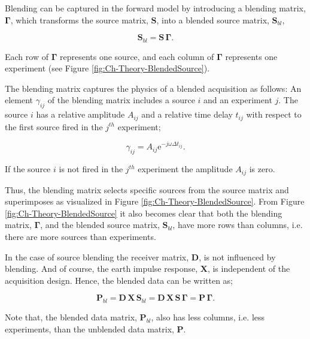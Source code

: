Blending can be captured in the forward model by introducing a blending matrix, $\mathbf{\Gamma}$, which transforms the source matrix, $\mathbf{S}$, into a blended source matrix, $\mathbf{S}_{bl}$,

\begin{equation}
	\mathbf{S}_{bl} = \mathbf{S \, \Gamma}.
	\label{eq:Ch-Theory-BlendedSource}
\end{equation}

 Each row of $\mathbf{\Gamma}$ represents one source, and each column of $\mathbf{\Gamma}$ represents one experiment (see Figure \ref{fig:Ch-Theory-BlendedSource}). 
 
 The blending matrix captures the physics of a blended acquisition as follows: An element $\gamma_{ij}$ of the blending matrix includes a source $i$ and an experiment $j$. The source $i$ has a relative amplitude $A_{ij}$ and a relative time delay $t_{ij}$ with respect to the first source fired in the $j^{th}$ experiment;

\begin{equation}
	\gamma_{ij} =  A_{ij} \mathrm{e}^{-j \omega \Delta t_{ij}}.
	\label{eq:Ch-Theory-BlendingElement}
\end{equation}  
 
If the source $i$ is not fired in the $j^{th}$ experiment the amplitude $A_{ij}$ is zero.

Thus, the blending matrix selects specific sources from the source matrix and superimposes as visualized in Figure \ref{fig:Ch-Theory-BlendedSource}. From Figure \ref{fig:Ch-Theory-BlendedSource} it also becomes clear that both the blending matrix, $\mathbf{\Gamma}$, and the blended source matrix, $\mathbf{S}_{bl}$, have more rows than columns, i.e. there are more sources than experiments. 

In the case of source blending the receiver matrix, $\mathbf{D}$, is not influenced by blending. And of course, the earth impulse response, $\mathbf{X}$, is independent of the acquisition design. Hence, the blended data can be written as;

\begin{equation}
	\mathbf{P}_{bl} = \mathbf{D} \, \mathbf{X} \, \mathbf{S}_{bl} = \mathbf{D} \, \mathbf{X} \, \mathbf{S} \, \mathbf{\Gamma} = \mathbf{P \, \Gamma}.
	\label{eq:Ch-Theory-BlendedData}
\end{equation}

Note that, the blended data matrix, $\mathbf{P}_{bl}$, also has less columns, i.e. less experiments, than the unblended data matrix, $\mathbf{P}$.



